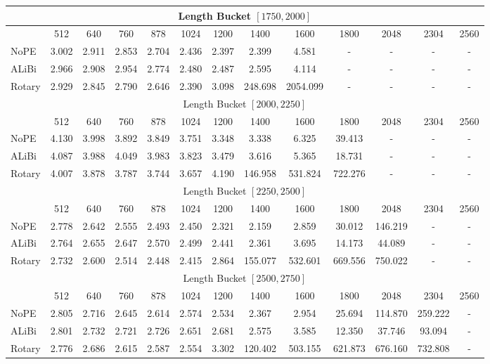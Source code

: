 {\begin{table}[#1]
{\begin{tabular}{l@{\hskip 0.5in}cccccccccccc}
\multicolumn{13}{c}{Length Bucket $[1750, 2000]$} \\
\midrule
 & 512 & 640 & 760 & 878 & 1024 & 1200 & 1400 & 1600 & 1800 & 2048 & 2304 & 2560 \\
 \cmidrule{2-13}
NoPE & 3.002 & 2.911 & 2.853 & 2.704 & 2.436 & 2.397 & 2.399 & 4.581 & - & - & - & - \\
ALiBi & 2.966 & 2.908 & 2.954 & 2.774 & 2.480 & 2.487 & 2.595 & 4.114 & - & - & - & - \\
Rotary & 2.929 & 2.845 & 2.790 & 2.646 & 2.390 & 3.098 & 248.698 & 2054.099 & - & - & - & - \\
\midrule

\multicolumn{13}{c}{Length Bucket $[2000, 2250]$} \\
\midrule
 & 512 & 640 & 760 & 878 & 1024 & 1200 & 1400 & 1600 & 1800 & 2048 & 2304 & 2560 \\
 \cmidrule{2-13}
NoPE & 4.130 & 3.998 & 3.892 & 3.849 & 3.751 & 3.348 & 3.338 & 6.325 & 39.413 & - & - & - \\
ALiBi & 4.087 & 3.988 & 4.049 & 3.983 & 3.823 & 3.479 & 3.616 & 5.365 & 18.731 & - & - & - \\
Rotary & 4.007 & 3.878 & 3.787 & 3.744 & 3.657 & 4.190 & 146.958 & 531.824 & 722.276 & - & - & - \\
\midrule

\multicolumn{13}{c}{Length Bucket $[2250, 2500]$} \\
\midrule
 & 512 & 640 & 760 & 878 & 1024 & 1200 & 1400 & 1600 & 1800 & 2048 & 2304 & 2560 \\
 \cmidrule{2-13}
NoPE & 2.778 & 2.642 & 2.555 & 2.493 & 2.450 & 2.321 & 2.159 & 2.859 & 30.012 & 146.219 & - & - \\
ALiBi & 2.764 & 2.655 & 2.647 & 2.570 & 2.499 & 2.441 & 2.361 & 3.695 & 14.173 & 44.089 & - & - \\
Rotary & 2.732 & 2.600 & 2.514 & 2.448 & 2.415 & 2.864 & 155.077 & 532.601 & 669.556 & 750.022 & - & - \\
\midrule

\multicolumn{13}{c}{Length Bucket $[2500, 2750]$} \\
\midrule
 & 512 & 640 & 760 & 878 & 1024 & 1200 & 1400 & 1600 & 1800 & 2048 & 2304 & 2560 \\
 \cmidrule{2-13}
NoPE & 2.805 & 2.716 & 2.645 & 2.614 & 2.574 & 2.534 & 2.367 & 2.954 & 25.694 & 114.870 & 259.222 & - \\
ALiBi & 2.801 & 2.732 & 2.721 & 2.726 & 2.651 & 2.681 & 2.575 & 3.585 & 12.350 & 37.746 & 93.094 & - \\
Rotary & 2.776 & 2.686 & 2.615 & 2.587 & 2.554 & 3.302 & 120.402 & 503.155 & 621.873 & 676.160 & 732.808 & - \\
\midrule


\end{tabular}}
\end{table}}
